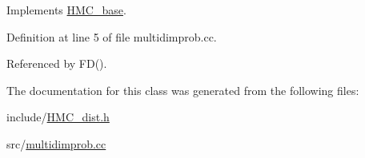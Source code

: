 Implements \hyperlink{class_h_m_c__base_aab381fd0838b1a831906025b98a0c897}{H\-M\-C\-\_\-base}.



Definition at line 5 of file multidimprob.\-cc.



Referenced by F\-D().



The documentation for this class was generated from the following files\-:\begin{DoxyCompactItemize}
\item 
include/\hyperlink{_h_m_c__dist_8h}{H\-M\-C\-\_\-dist.\-h}\item 
src/\hyperlink{multidimprob_8cc}{multidimprob.\-cc}\end{DoxyCompactItemize}
